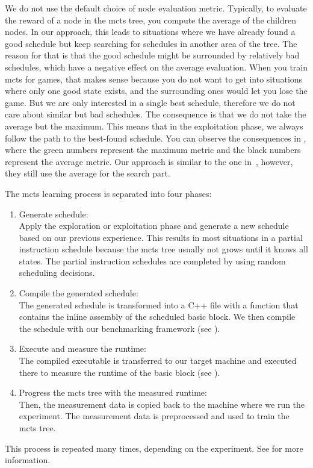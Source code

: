 We do not use the default choice of node evaluation metric.
Typically, to evaluate the reward of a node in the \ac{mcts} tree, you compute the average of the children nodes.
In our approach, this leads to situations where we have already found a good schedule but keep searching for schedules in another area of the tree.
The reason for that is that the good schedule might be surrounded by relatively bad schedules, which have a negative effect on the average evaluation.
When you train \ac{mcts} for games, that makes sense because you do not want to get into situations where only one good state exists, and the surrounding ones would let you lose the game.
But we are only interested in a single best schedule, therefore we do not care about similar but bad schedules.
The consequence is that we do not take the average but the maximum.
This means that in the exploitation phase, we always follow the path to the best-found schedule.
You can observe the consequences in , where the green numbers represent the maximum metric and the black numbers represent the average metric.
Our approach is similar to the one in~\cite{bjornsson2009cadiaplayer}, however, they still use the average for the search part.

The \ac{mcts} learning process is separated into four phases:
\begin{enumerate}
    \item Generate schedule: \\
    Apply the exploration or exploitation phase and generate a new schedule based on our previous experience.
    This results in most situations in a partial instruction schedule because the \ac{mcts} tree usually not grows until it knows all states.
    The partial instruction schedules are completed by using random scheduling decisions. 
    \item Compile the generated schedule: \\
    The generated schedule is transformed into a C++ file with a function that contains the inline assembly of the scheduled basic block.
    We then compile the schedule with our benchmarking framework (see ).
    \item Execute and measure the runtime: \\
    The compiled executable is transferred to our target machine and executed there to measure the runtime of the basic block (see ).
    \item Progress the \ac{mcts} tree with the measured runtime: \\
    Then, the measurement data is copied back to the machine where we run the experiment.
    The measurement data is preprocessed and used to train the \ac{mcts} tree.
\end{enumerate}
This process is repeated many times, depending on the experiment.
See  for more information.

